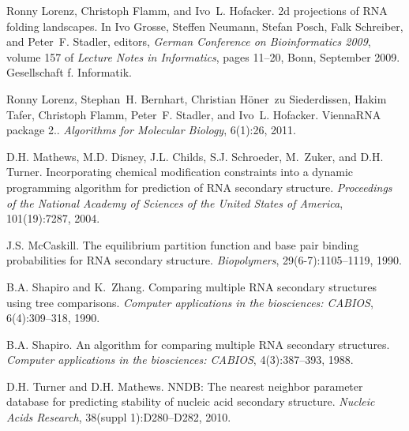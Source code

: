 \begin{DoxyDescription}
\item[\label{_CITEREF_lorenz:2009}%
\mbox{[}9\mbox{]}]Ronny Lorenz, Christoph Flamm, and Ivo~L. Hofacker. 2d projections of R\+N\+A folding landscapes. In Ivo Grosse, Steffen Neumann, Stefan Posch, Falk Schreiber, and Peter~F. Stadler, editors, {\itshape German Conference on Bioinformatics 2009}, volume 157 of {\itshape Lecture Notes in Informatics}, pages 11--20, Bonn, September 2009. Gesellschaft f. Informatik.


\item[\label{_CITEREF_lorenz:2011}%
\mbox{[}10\mbox{]}]Ronny Lorenz, Stephan~H. Bernhart, Christian H\"{o}ner~zu Siederdissen, Hakim Tafer, Christoph Flamm, Peter~F. Stadler, and Ivo~L. Hofacker. Vienna\+R\+N\+A package 2.. {\itshape Algorithms for Molecular Biology}, 6(1)\+:26, 2011. 


\item[\label{_CITEREF_mathews:2004}%
\mbox{[}11\mbox{]}]D.\+H. Mathews, M.\+D. Disney, J.\+L. Childs, S.\+J. Schroeder, M.~Zuker, and D.\+H. Turner. Incorporating chemical modification constraints into a dynamic programming algorithm for prediction of R\+N\+A secondary structure. {\itshape Proceedings of the National Academy of Sciences of the United States of America}, 101(19)\+:7287, 2004.


\item[\label{_CITEREF_mccaskill:1990}%
\mbox{[}12\mbox{]}]J.\+S. Mc\+Caskill. The equilibrium partition function and base pair binding probabilities for R\+N\+A secondary structure. {\itshape Biopolymers}, 29(6-\/7)\+:1105--1119, 1990.


\item[\label{_CITEREF_shapiro:1990}%
\mbox{[}13\mbox{]}]B.\+A. Shapiro and K.~Zhang. Comparing multiple R\+N\+A secondary structures using tree comparisons. {\itshape Computer applications in the biosciences\+: C\+A\+B\+I\+O\+S}, 6(4)\+:309--318, 1990.


\item[\label{_CITEREF_shapiro:1988}%
\mbox{[}14\mbox{]}]B.\+A. Shapiro. An algorithm for comparing multiple R\+N\+A secondary structures. {\itshape Computer applications in the biosciences\+: C\+A\+B\+I\+O\+S}, 4(3)\+:387--393, 1988.


\item[\label{_CITEREF_turner:2010}%
\mbox{[}15\mbox{]}]D.\+H. Turner and D.\+H. Mathews. N\+N\+D\+B\+: The nearest neighbor parameter database for predicting stability of nucleic acid secondary structure. {\itshape Nucleic Acids Research}, 38(suppl 1)\+:D280--D282, 2010.



\end{DoxyDescription}
